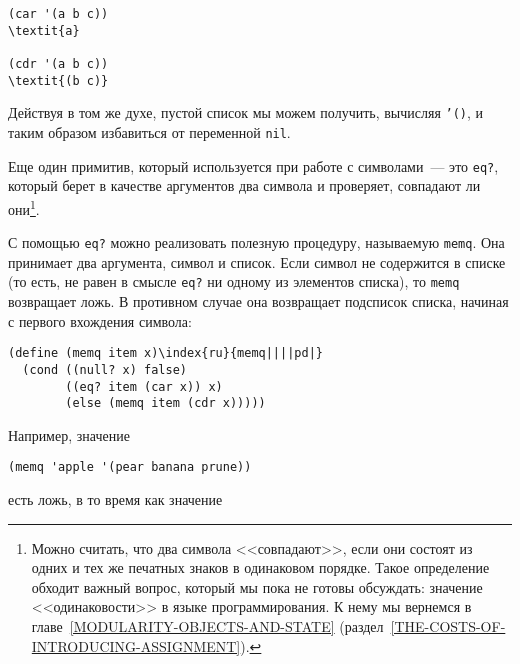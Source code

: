 \begin{Verbatim}[fontsize=\small]
(car '(a b c))
\textit{a}

(cdr '(a b c))
\textit{(b c)}
\end{Verbatim}
Действуя в том же духе, пустой список мы можем получить, вычисляя
{\tt '()}, и таким образом избавиться от переменной
{\tt nil}.

Еще один примитив, который используется при 
работе с символами~--- это {\tt eq?},
который берет в качестве
аргументов два символа и проверяет, совпадают ли они\footnote{Можно считать, что два символа <<совпадают>>, если они
состоят из одних и тех же печатных знаков в одинаковом порядке.  Такое
определение обходит важный вопрос, который мы пока не готовы
обсуждать: значение <<одинаковости>> в языке программирования.  К
нему мы вернемся в главе~\ref{MODULARITY-OBJECTS-AND-STATE} 
(раздел~\ref{THE-COSTS-OF-INTRODUCING-ASSIGNMENT}).}.

С помощью {\tt eq?} можно реализовать полезную процедуру,
называемую {\tt memq}. Она принимает два аргумента, символ и
список.  Если символ не содержится в списке (то есть, не равен в смысле 
{\tt eq?} ни одному из элементов списка), то
{\tt memq} возвращает ложь.  В противном случае она возвращает
подсписок списка, начиная с первого вхождения символа:

\begin{Verbatim}[fontsize=\small]
(define (memq item x)\index{ru}{memq||||pd|}
  (cond ((null? x) false)
        ((eq? item (car x)) x)
        (else (memq item (cdr x)))))
\end{Verbatim}
Например, значение

\begin{Verbatim}[fontsize=\small]
(memq 'apple '(pear banana prune))
\end{Verbatim}
есть ложь, в то время как значение

